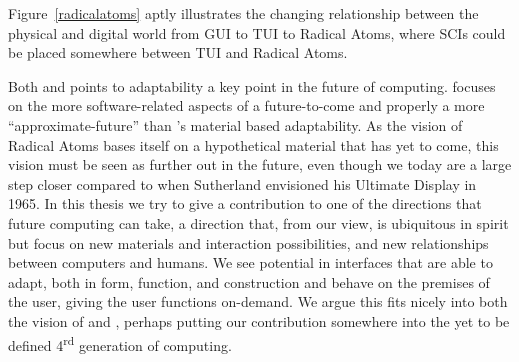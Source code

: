 Figure~\ref{radicalatoms} aptly illustrates the changing relationship between the physical and digital world from GUI to TUI to Radical Atoms, where SCIs could be placed somewhere between TUI and Radical Atoms.

Both \citeauthor{ishii2012radical} and \citeauthor{abowd2012next} points to adaptability a key point in the future of computing.
\citeauthor{abowd2012next} focuses on the more software-related aspects of a future-to-come and properly a more ``approximate-future'' than \citeauthor{ishii2012radical}'s material based adaptability.
As the vision of Radical Atoms bases itself on a hypothetical material that has yet to come, this vision must be seen as further out in the future, even though we today are a large step closer compared to when Sutherland envisioned his Ultimate Display in 1965. 
\blank
In this thesis we try to give a contribution to one of the directions that future computing can take, a direction that, from our view, is ubiquitous in spirit but focus on new materials and interaction possibilities, and new relationships between computers and humans.
We see potential in interfaces that are able to adapt, both in form, function, and construction and behave on the premises of the user, giving the user functions on-demand.
We argue this fits nicely into both the vision of \citeauthor{abowd2012next} and \citeauthor{ishii2012radical}, perhaps putting our contribution somewhere into the yet to be defined 4\textsuperscript{rd} generation of computing.